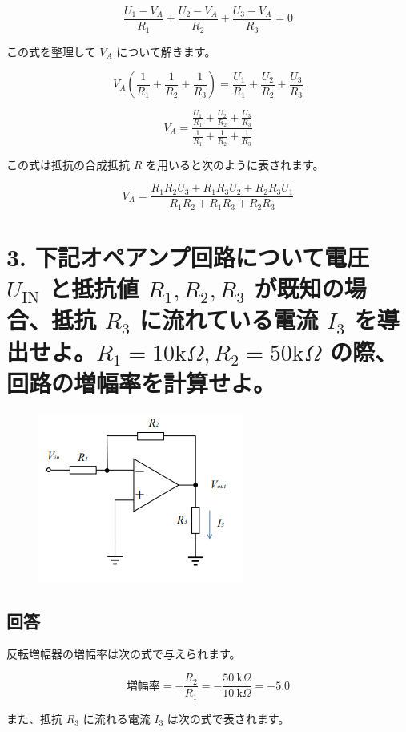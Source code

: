 \documentclass{article}
\begin{document}
\[
\frac{U_1 - V_A}{R_1} + \frac{U_2 - V_A}{R_2} + \frac{U_3 - V_A}{R_3} = 0
\]

この式を整理して \(V_A\) について解きます。

\[
V_A \left( \frac{1}{R_1} + \frac{1}{R_2} + \frac{1}{R_3} \right) = \frac{U_1}{R_1} + \frac{U_2}{R_2} + \frac{U_3}{R_3}
\]

\[
V_A = \frac{\frac{U_1}{R_1} + \frac{U_2}{R_2} + \frac{U_3}{R_3}}{\frac{1}{R_1} + \frac{1}{R_2} + \frac{1}{R_3}}
\]

この式は抵抗の合成抵抗 \(R\) を用いると次のように表されます。

\[
V_A = \frac{R_1 R_2 U_3 + R_1 R_3 U_2 + R_2 R_3 U_1}{R_1 R_2 + R_1 R_3 + R_2 R_3}
\]

\newpage  %

\section*{3. 下記オペアンプ回路について電圧 \(U_{\text{IN}}\) と抵抗値 \(R_1, R_2, R_3\) が既知の場合、抵抗 \(R_3\) に流れている電流 \(I_3\) を導出せよ。\(R_1=10\text{k}\Omega, R_2=50\text{k}\Omega\) の際、回路の増幅率を計算せよ。}
\begin{figure}[H]
    \centering
    \includegraphics[width=0.7\linewidth]{3.png}
\end{figure}

\subsection*{回答}
反転増幅器の増幅率は次の式で与えられます。

\[
\text{増幅率} = -\frac{R_2}{R_1} = -\frac{50\ \text{k}\Omega}{10\ \text{k}\Omega} = -5.0
\]

また、抵抗 \(R_3\) に流れる電流 \(I_3\) は次の式で表されます。
\end{document}
